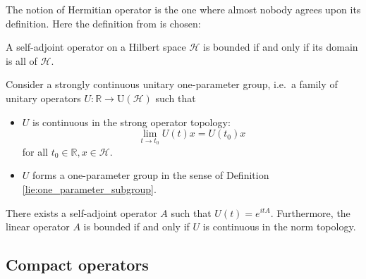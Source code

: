 
    The notion of Hermitian operator is the one where almost nobody agrees upon its definition. Here the definition from \cite{nlab} is chosen:

    \begin{theorem}
        A self-adjoint operator on a Hilbert space $\mathcal{H}$ is bounded if and only if its domain is all of $\mathcal{H}$.
    \end{theorem}

    \begin{theorem}[Stone]\label{functional:stone}
        Consider a strongly continuous unitary one-parameter group, i.e.~a family of unitary operators $U:\mathbb{R}\rightarrow\mathrm{U}(\mathcal{H})$ such that
        \begin{itemize}
            \item $U$ is continuous in the strong operator topology: \[\lim_{t\rightarrow t_0}U(t)x=U(t_0)x\] for all $t_0\in\mathbb{R}, x\in\mathcal{H}$.
            \item $U$ forms a one-parameter group in the sense of Definition \ref{lie:one_parameter_subgroup}.
        \end{itemize}
        There exists a self-adjoint operator $A$ such that $U(t)=e^{itA}$. Furthermore, the linear operator $A$ is bounded if and only if $U$ is continuous in the norm topology.
    \end{theorem}

\subsection{Compact operators}

